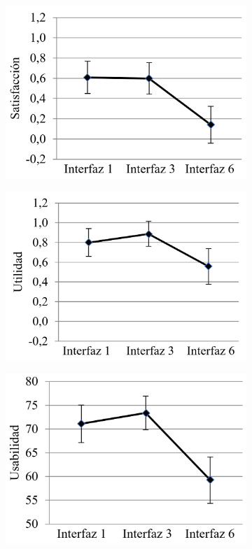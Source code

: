 \newpage
\begin{figure}[h]
  \centering
  \begin{subfigure}[b]{0.45\textwidth}
    \includegraphics[width=\textwidth]{figures/3.9a.png}
    \caption{}
    \label{fig:3.9a}
  \end{subfigure}
  \hfill
  \begin{subfigure}[b]{0.45\textwidth}
    \includegraphics[width=\textwidth]{figures/3.9b.png}
    \caption{}
    \label{fig:3.9b}
  \end{subfigure}
  \begin{subfigure}[b]{0.45\textwidth}
    \includegraphics[width=\textwidth]{figures/3.9c.png}

\end{subfigure}
\end{figure}
